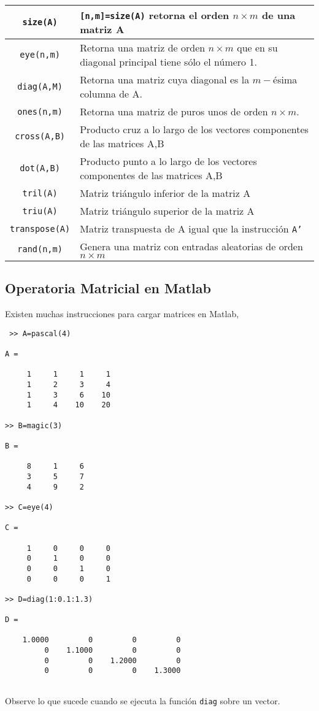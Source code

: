 \documentclass[letter,11pt]{article}
\begin{document}
\begin{longtable}{||c|p{}||}
\hline
\texttt{size(A)}	&	\texttt{[n,m]=size(A)} retorna el orden $n\times m$  de una matriz A\\
\hline
\texttt{eye(n,m)} 	& 	Retorna una matriz de orden $n\times m$ que en su diagonal principal tiene s\'olo el n\'umero 1. \\
\hline
\texttt{diag(A,M)}	&	Retorna una matriz cuya diagonal es la $m-$\'esima columna de A.\\
\hline
\texttt{ones(n,m)}	&  	Retorna una matriz de puros unos de orden $n\times m$. \\
\hline
\texttt{cross(A,B)} & 	Producto cruz a lo largo de los vectores componentes de las matrices A,B \\
\hline
\texttt{dot(A,B)}	&	Producto punto a lo largo de los vectores componentes de las matrices A,B \\
\hline
\texttt{tril(A)}	& 	Matriz tri\'angulo inferior de la matriz A\\
\hline
\texttt{triu(A)}	& 	Matriz tri\'angulo superior de la matriz A\\
\hline
\texttt{transpose(A)} & Matriz transpuesta de A igual que la instrucci\'on \texttt{A'}\\
\hline
\texttt{rand(n,m)}	&	Genera una matriz con entradas aleatorias de orden $n\times m$\\
\hline
\end{longtable}

\subsection{Operatoria Matricial en Matlab}
Existen muchas instrucciones para cargar matrices en Matlab,
\begin{multicols}{2}
\begin{verbatim}
 >> A=pascal(4)

A =

     1     1     1     1
     1     2     3     4
     1     3     6    10
     1     4    10    20 
     
>> B=magic(3)

B =

     8     1     6
     3     5     7
     4     9     2
     
>> C=eye(4)

C =

     1     0     0     0
     0     1     0     0
     0     0     1     0
     0     0     0     1
     
>> D=diag(1:0.1:1.3)

D =

    1.0000         0         0         0
         0    1.1000         0         0
         0         0    1.2000         0
         0         0         0    1.3000
     
     \end{verbatim}
\end{multicols}
Observe lo que sucede cuando se ejecuta la funci\'on \texttt{diag} sobre un vector.
\end{document}
